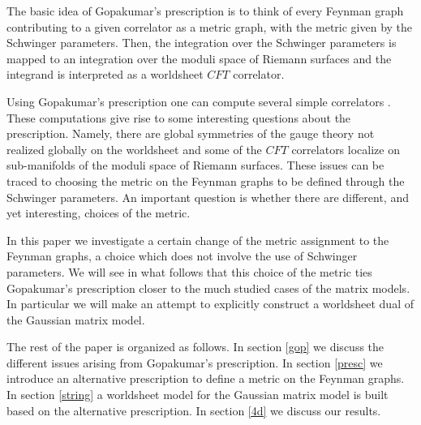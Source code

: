 \documentclass[11pt]{JHEP3}
\begin{document}
The basic idea of Gopakumar's prescription is to think of every Feynman graph contributing to a given correlator as a metric graph, with the metric given by 
the Schwinger parameters. Then, the integration over the  Schwinger parameters is mapped to an integration over the moduli space of Riemann surfaces and
the integrand is interpreted as a worldsheet $CFT$ correlator. 

Using Gopakumar's prescription one can compute several simple correlators \cite{Aharony:2006th,David:2006qc}. These computations give rise to some interesting questions about the prescription. Namely, there are global symmetries of the gauge theory not realized globally on the
worldsheet and some of the $CFT$ correlators localize on sub-manifolds of the moduli space of
Riemann surfaces. These issues can be traced to choosing the metric on the Feynman graphs to be 
defined through the Schwinger parameters.
An important question  is whether there are different, and yet
 interesting, choices of the metric.

 In this paper we investigate a certain change of the 
metric assignment to the Feynman graphs, a choice which does not involve the use of Schwinger 
parameters. We will see in what follows that this choice of the metric ties Gopakumar's prescription closer to the much
studied cases of the matrix models. In particular we will make an attempt to explicitly construct a worldsheet dual of the Gaussian matrix model.

The rest of the paper is organized as follows. In section \ref{gop} we discuss the different issues arising from Gopakumar's prescription. In section
\ref{presc} we introduce an alternative prescription to define a metric on the Feynman graphs. In section \ref{string}  a worldsheet model for the Gaussian matrix model is built  based on the alternative prescription. In section \ref{4d} we discuss our results. 
\end{document}
